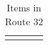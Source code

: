 \begin{longtable}{|| l l l l ||}%
\hline%
\endhead%
\hline%
\caption{Items in Route 32}%
\label{tab:Route32Items}%
\end{longtable}